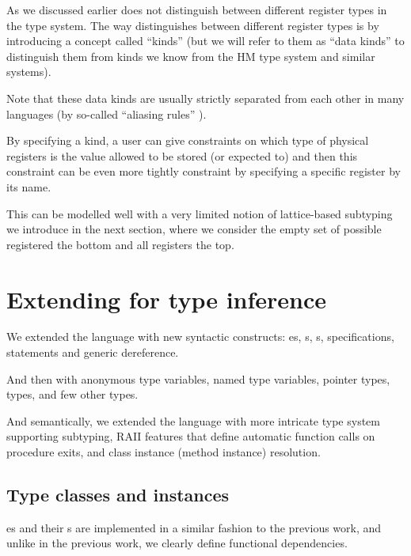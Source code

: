 As we discussed earlier \cmm{} does not distinguish between different register types in the type system. The way \cmm{} distinguishes between different register types is by introducing a concept called ``kinds'' (but we will refer to them as ``data kinds'' to distinguish them from kinds we know from the HM type system and similar systems).

Note that these data kinds are usually strictly separated from each other in many languages (by so-called ``aliasing rules'' ).

By specifying a kind, a user can give constraints on which type of physical registers is the value allowed to be stored (or expected to) and then this constraint can be even more tightly constraint by specifying a specific register by its name.

This can be modelled well with a very limited notion of lattice-based subtyping we introduce in the next section, where we consider the empty set of possible registered the bottom and all registers the top.


\section{Extending \cmm{} for type inference}

We extended the language with new syntactic constructs: es, s, s,  specifications,  statements and \li{[ptr]} generic dereference.

And then with  anonymous type variables,  named type variables,  pointer types,  types, and few other types.

And semantically, we extended the language with more intricate type system supporting subtyping, RAII features that define automatic function calls on procedure exits, and class instance (method instance) resolution.

\subsection{Type classes and instances}

es and their s are implemented in a similar fashion to the previous work, and unlike in the previous work, we clearly define functional dependencies.

